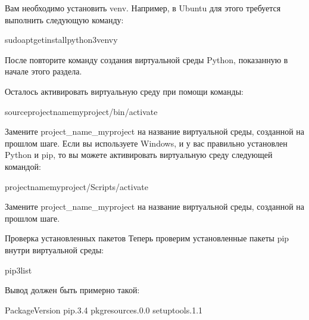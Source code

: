 \documentclass[letterpaper,10pt,russian]{sphinxmanual}
\begin{document}
\sphinxAtStartPar
Вам необходимо установить venv. Например, в Ubuntu для этого требуется выполнить следующую команду:

\begin{sphinxVerbatim}[commandchars=\\\{\}]
\PYGZdl{}sudoapt\PYGZhy{}getinstallpython3\PYGZhy{}venv\PYGZhy{}y
\end{sphinxVerbatim}

\sphinxAtStartPar
После повторите команду создания виртуальной среды Python, показанную в начале этого раздела.

\sphinxAtStartPar
{}

\sphinxAtStartPar
Осталось активировать виртуальную среду при помощи команды:

\begin{sphinxVerbatim}[commandchars=\\\{\}]
\PYGZdl{}sourceproject\PYGZus{}name\PYGZus{}myproject/bin/activate
\end{sphinxVerbatim}

\sphinxAtStartPar
Замените project\_name\_myproject на название виртуальной среды, созданной на прошлом шаге.
Если вы используете Windows, и у вас правильно установлен Python и pip, то вы можете активировать виртуальную среду следующей командой:

\begin{sphinxVerbatim}[commandchars=\\\{\}]
\PYGZdl{}project\PYGZus{}name\PYGZus{}myproject/Scripts/activate
\end{sphinxVerbatim}

\sphinxAtStartPar
Замените project\_name\_myproject на название виртуальной среды, созданной на прошлом шаге.

\sphinxAtStartPar
Проверка установленных пакетов
Теперь проверим установленные пакеты pip внутри виртуальной среды:

\begin{sphinxVerbatim}[commandchars=\\\{\}]
\PYGZdl{}pip3list
\end{sphinxVerbatim}

\sphinxAtStartPar
Вывод должен быть примерно такой:

\begin{sphinxVerbatim}[commandchars=\\\{\}]
PackageVersion
\PYGZhy{}\PYGZhy{}\PYGZhy{}\PYGZhy{}\PYGZhy{}\PYGZhy{}\PYGZhy{}\PYGZhy{}\PYGZhy{}\PYGZhy{}\PYGZhy{}\PYGZhy{}\PYGZhy{}\PYGZhy{}\PYGZhy{}\PYGZhy{}\PYGZhy{}\PYGZhy{}\PYGZhy{}\PYGZhy{}
pip.3.4
pkg\PYGZhy{}resources.0.0
setuptools.1.1
\end{sphinxVerbatim}
\end{document}
